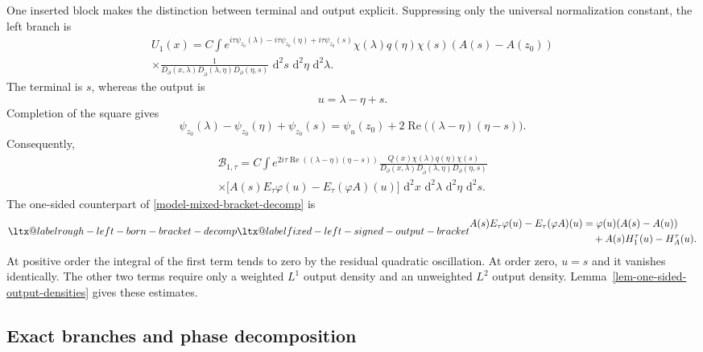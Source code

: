\documentclass[a4paper,11pt]{article}
\makeatletter
\newcommand{\dd}{\,\text{d}}
\newcommand{\aliaslabel}[1]{\ltx@label{#1}}
\theoremstyle{plain}
\theoremstyle{definition}
\theoremstyle{remark}
\makeatother
\begin{document}
One inserted block makes the distinction between terminal and output explicit. Suppressing only the universal normalization constant, the left branch is
\begin{multline}\label{model-U1-expanded}
 U_1(x)=C\int e^{i\tau\psi_{z_0}(\lambda)
 -i\tau\psi_{z_0}(\eta)+i\tau\psi_{z_0}(s)}
 \chi(\lambda)q(\eta)\chi(s)(A(s)-A(z_0))\\
 \times\frac{1}
 {D_\partial(x,\lambda)D_{\bar\partial}(\lambda,\eta)
 D_\partial(\eta,s)}\,\dd^2s\,\dd^2\eta\,\dd^2\lambda.
\end{multline}
The terminal is $s$, whereas the output is
\begin{equation}\label{model-left-output}
 u=\lambda-\eta+s.
\end{equation}
Completion of the square gives
\begin{equation}\label{model-left-phase}
 \psi_{z_0}(\lambda)-\psi_{z_0}(\eta)+\psi_{z_0}(s)
 =\psi_u(z_0)+2\operatorname{Re}\bigl((\lambda-\eta)(\eta-s)\bigr).
\end{equation}
Consequently,
\begin{multline}\label{model-U1-output-integral}
 \mathcal B_{1,\tau}
 =C\int e^{2i\tau\operatorname{Re}((\lambda-\eta)(\eta-s))}
 \frac{Q(x)\chi(\lambda)q(\eta)\chi(s)}
 {D_\partial(x,\lambda)D_{\bar\partial}(\lambda,\eta)D_\partial(\eta,s)}\\
 \times\bigl[A(s)E_\tau\varphi(u)-E_\tau(\varphi A)(u)\bigr]
 \,\dd^2x\,\dd^2\lambda\,\dd^2\eta\,\dd^2s.
\end{multline}
The one-sided counterpart of \eqref{model-mixed-bracket-decomp} is
\begin{equation}\label{model-one-sided-bracket}\aliaslabel{rough-left-born-bracket-decomp}\aliaslabel{fixed-left-signed-output-bracket}
\begin{aligned}
 A(s)E_\tau\varphi(u)-E_\tau(\varphi A)(u)
 &=\varphi(u)(A(s)-A(u))\\
 &\quad+A(s)H_1^\tau(u)-H_A^\tau(u).
\end{aligned}
\end{equation}
At positive order the integral of the first term tends to zero by the residual quadratic oscillation. At order zero, $u=s$ and it vanishes identically. The other two terms require only a weighted $L^1$ output density and an unweighted $L^2$ output density. Lemma~\ref{lem-one-sided-output-densities} gives these estimates.

\subsection{Exact branches and phase decomposition}
\end{document}
